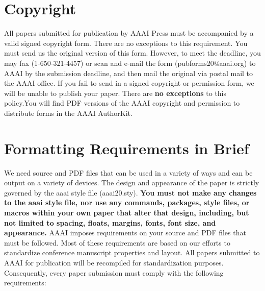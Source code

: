 \documentclass[letterpaper]{article} %
\begin{document}
\section{Copyright}
All papers submitted for publication by AAAI Press must be accompanied by a valid signed copyright form. There are no exceptions to this requirement. You must send us the original version of this form. However, to meet the deadline, you may fax (1-650-321-4457) or scan and e-mail the form (pubforms20@aaai.org) to AAAI by the submission deadline, and then mail the original via postal mail to the AAAI office. If you fail to send in a signed copyright or permission form, we will be unable to publish your paper. There are \textbf{no exceptions} to this policy.You will find PDF versions of the AAAI copyright and permission to distribute forms in the AAAI AuthorKit.

\section{Formatting Requirements in Brief}
We need source and PDF files that can be used in a variety of ways and can be output on a variety of devices. The design and appearance of the paper is strictly governed by the aaai style file (aaai20.sty). 
\textbf{You must not make any changes to the aaai style file, nor use any commands, packages, style files, or macros within your own paper that alter that design, including, but not limited to spacing, floats, margins, fonts, font size, and appearance.} AAAI imposes requirements on your source and PDF files that must be followed. Most of these requirements are based on our efforts to standardize conference manuscript properties and layout. All papers submitted to AAAI for publication will be recompiled for standardization purposes. Consequently, every paper submission must comply with the following requirements:
\end{document}

